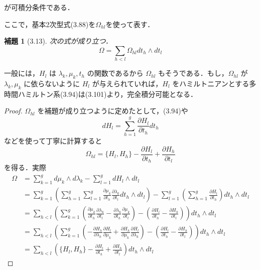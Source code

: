 \documentclass[paper=a4, fontsize=11pt]{jlreq} %
\newenvironment{story}{%
  \begin{mdframed}[
    backgroundcolor=red!5, %
    linewidth=0pt,         %
    innertopmargin=10pt,   %
    innerbottommargin=10pt,
    innerrightmargin=10pt, %
    innerleftmargin=10pt
  ]%
}{%
  \end{mdframed}%
}
\theoremstyle{break}
\newtheorem{lemma}[theorem]{補題}
\theoremstyle{qa}
\begin{document}
が可積分条件である．
\begin{story}
ここで，基本2次型式(3.88)を$\Omega_{hl}$を使って表す．

\begin{lemma}[3.13]
次の式が成り立つ．
\begin{equation*}
    \Omega = \sum_{h<l} \Omega_{hl} dt_h \wedge dt_l
\end{equation*}
\end{lemma}

一般には，$H_l$ は $\lambda_k, \mu_k, t_h$ の関数であるから $\Omega_{hl}$ もそうである．もし，$\Omega_{hl}$ が $\lambda_k, \mu_k$ に依らないように $H_l$ が与えられていれば，$H_l$ をハミルトニアンとする多時間ハミルトン系(3.94)は(3.101)より，完全積分可能となる．

\begin{proof}$\Omega_{hl}$ を補題が成り立つように定めたとして，(3.94)や
\begin{equation*}
    dH_l = \sum_{h=1}^g \frac{\partial H_l}{\partial t_h} dt_h
\end{equation*}
などを使って丁寧に計算すると
\begin{equation*}
    \Omega_{hl} = \{H_l, H_h\} - \frac{\partial H_l}{\partial t_h} + \frac{\partial H_h}{\partial t_l}
\end{equation*}
を得る．実際
\begin{align*}
    \Omega &= \sum_{k=1}^g d\mu_k \wedge d\lambda_k - \sum_{l=1}^g dH_l \wedge dt_l \\
    &= \sum_{k=1}^g \left( \sum_{h=1}^g \sum_{l=1}^g \frac{\partial \mu_k}{\partial t_h} \frac{\partial \lambda_k}{\partial t_l} dt_h \wedge dt_l \right) - \sum_{l=1}^g \left( \sum_{h=1}^g \frac{\partial H_l}{\partial t_h} \right) dt_h \wedge dt_l \\
    &= \sum_{h<l} \left( \sum_{k=1}^g \left( \frac{\partial \mu_k}{\partial t_h} \frac{\partial \lambda_k}{\partial t_l} - \frac{\partial \lambda_k}{\partial t_h} \frac{\partial \mu_k}{\partial t_l} \right) - \left( \frac{\partial H_l}{\partial t_h} - \frac{\partial H_h}{\partial t_l} \right) \right) dt_h \wedge dt_l \\
    &= \sum_{h<l} \left( \sum_{k=1}^g \left( -\frac{\partial H_h}{\partial \lambda_k} \frac{\partial H_l}{\partial \mu_k} + \frac{\partial H_h}{\partial \mu_k} \frac{\partial H_l}{\partial \lambda_k} \right) - \left( \frac{\partial H_l}{\partial t_h} - \frac{\partial H_h}{\partial t_l} \right) \right) dt_h \wedge dt_l \\
    &= \sum_{h<l} \left( \lbrace H_l, H_h \rbrace - \frac{\partial H_l}{\partial t_h} + \frac{\partial H_h}{\partial t_l} \right) dt_h \wedge dt_l

\end{align*}
\end{proof}
\end{story}
\end{document}
